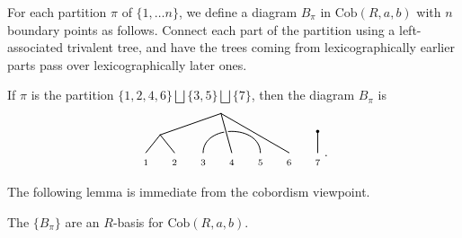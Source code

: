 \documentclass[12pt]{amsart}
\begin{document}
\begin{definition}
     For each partition $\pi$ of $\{1, \ldots n\}$, we define a diagram $B_\pi$ in $\mathrm{Cob}(R,a, b)$ with $n$ boundary points as follows. Connect each part of the partition using a left-associated trivalent tree, and have the trees coming from lexicographically earlier parts pass over lexicographically later ones.
 \end{definition}

\begin{example}
    If $\pi$ is the partition
    $\{1,2,4,6\}\bigsqcup\{3,5\}\bigsqcup\{7\}$,
    then the diagram $B_\pi$ is
    \[
    \begin{tikzpicture}[
        baseline=-0.1cm,
        line cap=round,
        line join=round
    ]
        \foreach \i in {1,...,7} {
            \coordinate (p\i) at ({0.8*(\i-1)},0);
            \node[below=2pt] at (p\i) {\scriptsize $\i$};
        }

        \draw[line width=0.7pt]
            (p3) .. controls (1.6,0.8) and (3.2,0.8) .. (p5);

        \coordinate (vone) at (0.4,0.5);
        \coordinate (vtwo) at (2.1,1.1);

        \draw[white,line width=3pt]
            (p1) -- (vone)
            (p2) -- (vone)
            (vone) -- (vtwo)
            (p4) -- (vtwo)
            (p6) -- (vtwo);

        \draw[black,line width=0.7pt]
            (p1) -- (vone)
            (p2) -- (vone)
            (vone) -- (vtwo)
            (p4) -- (vtwo)
            (p6) -- (vtwo);

        \coordinate (vthree) at (4.8,0.6);
        \draw[line width=0.7pt] (p7) -- (vthree);
        \fill (vthree) circle (1.3pt);
    \end{tikzpicture}.
    \]
\end{example}

The following lemma is immediate from the cobordism viewpoint.
  
\begin{lemma}
     The $\{B_\pi\}$ are an $R$-basis for $\mathrm{Cob}(R,a,b)$.
 \end{lemma}
\end{document}
